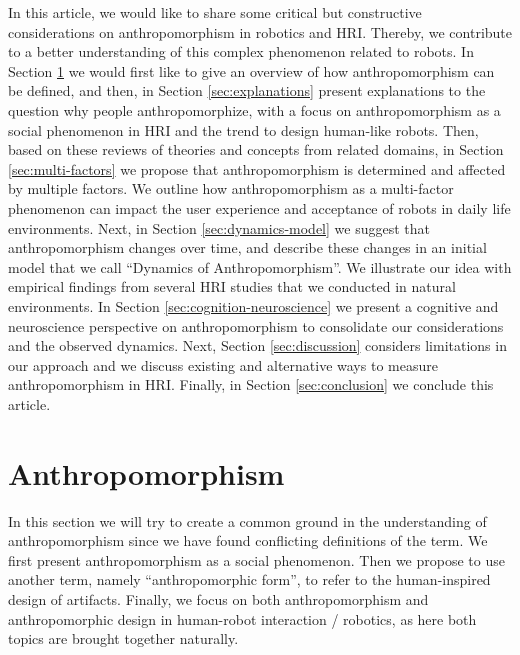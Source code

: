 \documentclass{frontiersSCNS} %
\begin{document}
In this article, we would like to share some critical but constructive considerations on anthropomorphism in robotics and HRI. Thereby, we contribute to a better understanding of this complex phenomenon related to robots. In Section \ref{sec:anthropomorphism} we would first like to give an overview of how anthropomorphism can be defined, and then, in Section \ref{sec:explanations} present explanations to the question why people anthropomorphize, with a focus on anthropomorphism as a social phenomenon in HRI and the trend to design human-like robots. Then, based on these reviews of theories and concepts from related domains, in Section \ref{sec:multi-factors} we propose that anthropomorphism is determined and affected by multiple factors. We outline how anthropomorphism as a multi-factor phenomenon can impact the user experience and acceptance of robots in daily life environments. Next, in Section \ref{sec:dynamics-model} we suggest that anthropomorphism changes over time, and describe these changes in an initial model that we call ``Dynamics of Anthropomorphism''. We illustrate our idea with empirical findings from several HRI studies that we conducted in natural environments. In Section \ref{sec:cognition-neuroscience} we present a cognitive and neuroscience perspective on anthropomorphism to consolidate our considerations and the observed dynamics. Next, Section \ref{sec:discussion} considers limitations in our approach and we discuss existing and alternative ways to measure anthropomorphism in HRI. Finally, in Section \ref{sec:conclusion} we conclude this article. 



%
%
%
%
%
%
%
%
%

\section{Anthropomorphism}
\label{sec:anthropomorphism}

In this section we will try to create a common ground in the understanding of anthropomorphism since we have found conflicting definitions of the term. We first present anthropomorphism as a social phenomenon. Then we propose to use another term, namely ``anthropomorphic form'', to refer to the human-inspired design of artifacts. Finally, we focus on both anthropomorphism and anthropomorphic design in human-robot interaction / robotics, as here both topics are brought together naturally. 
\end{document}
